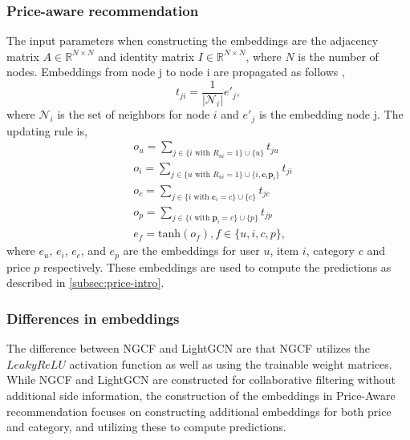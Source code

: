 \subsubsection{Price-aware recommendation}\label{subsubsec:price}
The input parameters when constructing the embeddings are the adjacency matrix $A \in \mathbb{R}^{N \times N}$ and identity matrix $I \in \mathbb{R}^{N \times N}$, where $N$ is the number of nodes.
Embeddings from node j to node i are propagated as follows \cite{Priceaware},
\begin{equation}
    t_{ji} = \frac{1}{|\mathcal{N}_i|}e'_j,
\end{equation}
where $\mathcal{N}_i$ is the set of neighbors for node $i$ and $e'_j$ is the embedding node j.
The updating rule is,
\begin{equation}
    \begin{split}
        & o_u = \sum_{j \in \{i \textrm{ with } R_{ui}=1 \} \cup \{ u\}}^{} t_{ju}                            \\
        & o_i = \sum_{j \in \{u \textrm{ with } R_{ui}=1 \} \cup \{ i, \textbf{c}_i \textbf{p}_i\}}^{} t_{ji} \\
        & o_c = \sum_{j \in \{i \textrm{ with } \textbf{c}_i=c \} \cup \{ c\}}^{} t_{jc}                      \\
        & o_p = \sum_{j \in \{i \textrm{ with } \textbf{p}_i=c \} \cup \{ p\}}^{} t_{jp}                      \\
        & e_f = \textrm{tanh}(o_f), f \in \{u, i, c, p\},
    \end{split}
\end{equation}
where $e_u$, $e_i$, $e_c$, and $e_p$ are the embeddings for user $u$, item $i$, category $c$ and price $p$ respectively.
These embeddings are used to compute the predictions as described in \autoref{subsec:price-intro}.

\subsubsection{Differences in embeddings}
The difference between NGCF and LightGCN are that NGCF utilizes the $LeakyReLU$ activation function as well as using the trainable weight matrices.
While NGCF and LightGCN are constructed for collaborative filtering without additional side information, the construction of the embeddings in Price-Aware recommendation focuses on constructing additional embeddings for both price and category, and utilizing these to compute predictions.
